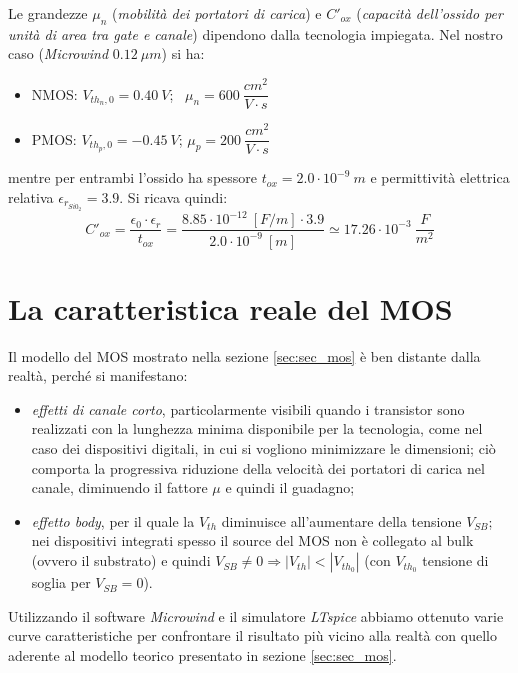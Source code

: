 Le grandezze $\mu _n$ (\textit{mobilità dei portatori di carica}) e $C'_{ox}$ (\textit{capacità dell’ossido per unità di area tra gate e canale}) dipendono dalla tecnologia impiegata. Nel nostro caso (\textit{Microwind} $0.12 \ \mu m$) si ha:
\begin{itemize}
	\item NMOS: \quad $V_{th_n,0} = 0.40 \ V$; \ \quad $\mu _n = 600 \ \dfrac{cm^2}{V \cdot s}$
	\item PMOS: \quad $V_{th_p,0} = -0.45 \ V$; \quad $\mu _p = 200 \ \dfrac{cm^2}{V \cdot s}$
\end{itemize}
mentre per entrambi l'ossido ha spessore $t_{ox} = 2.0 \cdot 10^{-9} \ m$ e permittività elettrica relativa $\epsilon_{r_{Si0_2}} = 3.9$. Si ricava quindi:
\begin{equation}
C'_{ox} = \frac{\epsilon_0 \cdot \epsilon_r}{t_{ox}} = \dfrac{8.85 \cdot 10^{-12} \ [F/m] \cdot 3.9}{2.0 \cdot 10^{-9} \ [m]}\simeq 17.26 \cdot 10^{-3} \ \dfrac{F}{m^2}
\end{equation}

\section{La caratteristica reale del MOS}
\label{sec:sec_caratteristicaMOS}
Il modello del MOS mostrato nella sezione \ref{sec:sec_mos} è ben distante dalla realtà, perché si manifestano:
\begin{itemize}
	\item \textit{effetti di canale corto}, particolarmente visibili quando i transistor sono realizzati con la lunghezza minima disponibile per la tecnologia, come nel caso dei dispositivi digitali, in cui si vogliono minimizzare le dimensioni; ciò comporta la progressiva riduzione della velocità dei portatori di carica nel canale, diminuendo il fattore $\mu$ e quindi il guadagno;
	\item \textit{effetto body}, per il quale la $V_{th}$ diminuisce all'aumentare della tensione $V_{SB}$; nei dispositivi integrati spesso il source del MOS non è collegato al bulk (ovvero il substrato) e quindi $V_{SB} \neq 0 \Rightarrow \left | V_{th} \right | < \left | V_{th_0} \right | $ (con $V_{th_0}$ tensione di soglia per $V_{SB}=0$).
\end{itemize}

Utilizzando il software \textit{Microwind} e il simulatore \textit{LTspice} abbiamo ottenuto varie curve caratteristiche per confrontare il risultato più vicino alla realtà con quello aderente al modello teorico presentato in sezione \ref{sec:sec_mos}.


